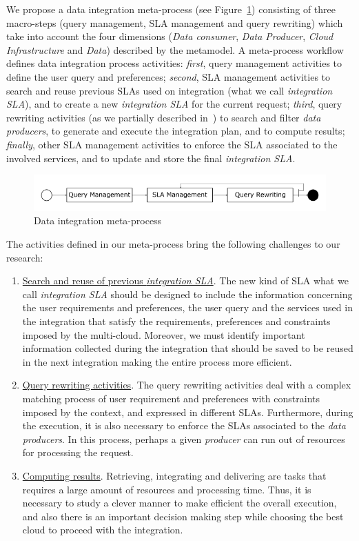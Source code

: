 We propose a data integration meta-process (see Figure~\ref{fig:metaprocess}) consisting of three macro-steps (query management, SLA management and query rewriting) which take into account  the four  dimensions (\textsl{Data consumer}, \textsl{Data Producer}, \textsl{Cloud Infrastructure} and \textsl{Data}) described by the metamodel.
A meta-process workflow defines data integration process activities: \textit{first}, query management activities  to define the user query and preferences; \textit{second}, SLA management activities  to search and reuse previous SLAs used on integration (what we call \textsl{integration SLA}), and to create a new \textsl{integration SLA} for the current request; \textit{third}, query rewriting activities (as we partially described in~\cite{carvalho2016}) to search and filter \textsl{data producers}, to generate and execute the integration plan, and to compute results; \textit{finally}, other SLA management activities  to enforce the SLA associated to the involved services, and to update and store the final \textsl{integration SLA}. 

\begin{figure}[h!]
\center
\includegraphics[scale=0.50]{meta-process.png}
\caption{Data integration meta-process}\label{fig:metaprocess}
\end{figure}

The activities defined in our meta-process bring the following challenges to our research:
\begin{enumerate}
\item \underline{Search and reuse of previous \textsl{integration SLA}}. The new kind of SLA what we call \textsl{integration SLA} should be designed to include the information concerning the user requirements and preferences, the user query and the services used in the integration that satisfy the requirements, preferences and constraints imposed by the multi-cloud. Moreover, we must identify important information collected during the integration that should be saved  to be reused in the next integration making the entire process more efficient. 
\item \underline{Query rewriting activities}. The query rewriting activities deal with a complex matching process of user requirement and preferences with constraints imposed by the context, and expressed in different SLAs. Furthermore, during the execution, it is also necessary to enforce the SLAs associated to the \textsl{data producers}. In this process, perhaps a given \textsl{producer} can run out of resources for processing the request.
\item \underline{Computing results}. Retrieving, integrating and delivering are tasks that requires a large amount of resources and processing time. Thus, it is necessary to study a clever manner to make efficient the overall execution, and also there is an important decision making step while choosing the best cloud to proceed with the integration.
\end{enumerate}

